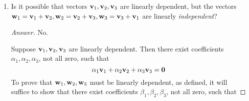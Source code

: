 \documentclass[../psets.tex]{subfiles}
\begin{document}
\begin{enumerate}[label={\textbf{2.\arabic*.}}]
\begin{proof}[Answer]
        Let $\vm_{r+1}$ be any vector that cannot be represented as a linear combination $\sum_{k=1}^r\alpha_k\vm_k$ (we are guaranteed that one exists, because otherwise $\vm_1,\dots,\vm_r$ would be generating). Now suppose for the sake of contradiction that the new list is linearly dependent. Then there exist coefficients $\alpha_1,\dots,\alpha_{r+1}$, not all zero, such that
        \begin{equation*}
            \alpha_1\vm_1+\cdots+\alpha_{r+1}\vm_{r+1} = \bm{0}
        \end{equation*}
        We divide into two cases ($\alpha_{r+1}=0$ and $\alpha_{r+1}\neq 0$). If $\alpha_{r+1}=0$, then it must be at least one of $\alpha_1,\dots,\alpha_r$ is nonzero by hypothesis. But then
        \begin{align*}
            \bm{0} &= \alpha_1\vm_1+\cdots+\alpha_r\vm_r+\alpha_{r+1}\vm_{r+1}\\
            \bm{0}-0\vm_{r+1} &= \alpha_1\vm_1+\cdots+\alpha_r\vm_r\\
            \bm{0} &= \alpha_1\vm_1+\cdots+\alpha_r\vm_r
        \end{align*}
        for a set of coefficients $\alpha_1,\dots,\alpha_r\in\F$, not all zero, contradicting the fact that $\vm_1,\dots,\vm_r$ are linearly independent. On the other hand, if $\alpha_{r+1}\neq 0$, then
        \begin{equation*}
            \vm_{r+1} = -\frac{\alpha_1}{\alpha_{r+1}}\vm_1-\cdots-\frac{\alpha_r}{\alpha_{r+1}}\vm_r
        \end{equation*}
        so $\vm_{r+1}$ can be expressed as a linear combination of $\vm_1,\dots,\vm_r$, a contradiction.
    \end{proof}
    \item Is it possible that vectors $\mathbf{v}_1,\mathbf{v}_2,\mathbf{v}_3$ are linearly dependent, but the vectors $\mathbf{w}_1=\mathbf{v}_1+\mathbf{v}_2,\mathbf{w}_2=\mathbf{v}_2+\mathbf{v}_3,\mathbf{w}_3=\mathbf{v}_3+\mathbf{v}_1$ are linearly \emph{independent}?
    \begin{proof}[Answer]
        No.\par
        Suppose $\mathbf{v}_1,\mathbf{v}_2,\mathbf{v}_3$ are linearly dependent. Then there exist coefficients $\alpha_1,\alpha_2,\alpha_3$, not all zero, such that
        \begin{equation*}
            \alpha_1\mathbf{v}_1+\alpha_2\mathbf{v}_2+\alpha_3\mathbf{v}_3 = \bm{0}
        \end{equation*}
        To prove that $\mathbf{w}_1,\mathbf{w}_2,\mathbf{w}_3$ must be linearly dependent, as defined, it will suffice to show that there exist coefficients $\beta_1,\beta_2,\beta_3$, not all zero, such that

\end{proof}
\end{enumerate}
\end{document}
